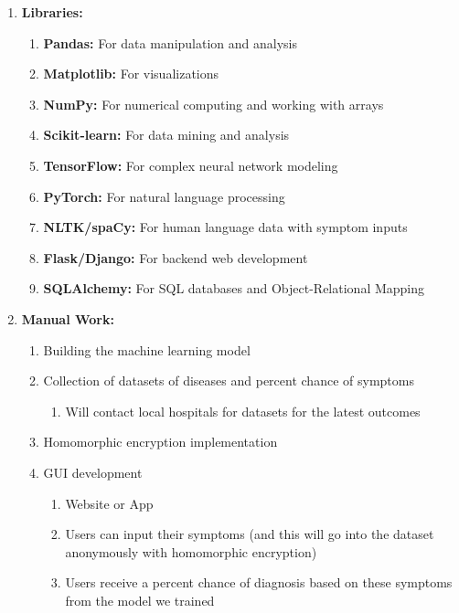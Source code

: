 \documentclass{article}
\begin{document}
\begin{enumerate}
\begin{enumerate}
            \item \textbf{Libraries:}
            \begin{enumerate}
                \item \textbf{Pandas:} For data manipulation and analysis
                \item \textbf{Matplotlib:} For visualizations
                \item \textbf{NumPy:} For numerical computing and working with arrays
                \item \textbf{Scikit-learn:} For data mining and analysis
                \item \textbf{TensorFlow:} For complex neural network modeling
                \item \textbf{PyTorch:} For natural language processing
                \item \textbf{NLTK/spaCy:} For human language data with symptom inputs
                \item \textbf{Flask/Django:} For backend web development
                \item \textbf{SQLAlchemy:} For SQL databases and Object-Relational Mapping
            \end{enumerate}
            \item \textbf{Manual Work:}
                \begin{enumerate}
                    \item Building the machine learning model
                    \item Collection of datasets of diseases and percent chance of symptoms
                    \begin{enumerate}
                        \item Will contact local hospitals for datasets for the latest outcomes
                    \end{enumerate}
                    \item Homomorphic encryption implementation
                    \item GUI development
                    \begin{enumerate}
                        \item Website or App
                        \item Users can input their symptoms (and this will go into the dataset anonymously with homomorphic encryption)
                        \item Users receive a percent chance of diagnosis based on these symptoms from the model we trained \\ \\

\end{enumerate}
\end{enumerate}
\end{enumerate}
\end{enumerate}
\end{document}
